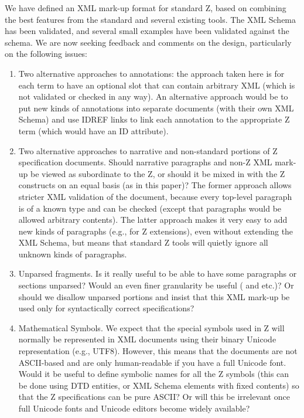 \documentclass{llncs}  %
\begin{document}
We have defined an XML mark-up format for standard Z, based on
combining the best features from the standard and several existing 
tools.  The XML Schema has been validated, and several small examples
have been validated against the schema.  We are now seeking feedback 
and comments on the design, particularly on the following issues:
\begin{enumerate}
\item Two alternative approaches to annotations: the approach taken
  here is for each term to have an optional  slot that can
  contain arbitrary XML (which is not validated or checked in any way).  
  An alternative approach would be to put new kinds of annotations into
  separate documents (with their own XML Schema) and use IDREF links
  to link each annotation to the appropriate Z term (which would have an ID
  attribute).  
\item Two alternative approaches to narrative and non-standard portions of
  Z specification documents.  Should narrative paragraphs and non-Z XML
  mark-up be viewed as subordinate to the Z, or should it be mixed in
  with the Z constructs on an equal basis (as in this paper)?  The former
  approach allows stricter XML validation of the document, because every
  top-level paragraph is of a known type and can be checked (except that
   paragraphs would be allowed arbitrary contents).
  The latter approach makes it very easy to add new kinds of paragraphs
  (e.g., for Z extensions), even without extending the XML Schema, but
  means that standard Z tools will quietly ignore all unknown kinds of
  paragraphs.
\item Unparsed fragments.  Is it really useful to be able to have some
  paragraphs or sections unparsed?  Would an even finer granularity be
  useful ( and  etc.)?  Or should we disallow
  unparsed portions and insist that this XML mark-up be used only for
  syntactically correct specifications? 
\item Mathematical Symbols.  We expect that the special symbols used in Z
  will normally be represented in XML documents using their binary Unicode
  representation (e.g., UTF8).  However, this means that the documents are
  not ASCII-based and are only human-readable if you have a full Unicode
  font.  Would it be useful to define symbolic names for all the Z symbols
  (this can be done using DTD entities, or XML Schema elements with fixed
  contents) so that the Z specifications can be pure ASCII?  Or will this
  be irrelevant once full Unicode fonts and Unicode editors become widely
  available? 
\end{enumerate}
\end{document}
